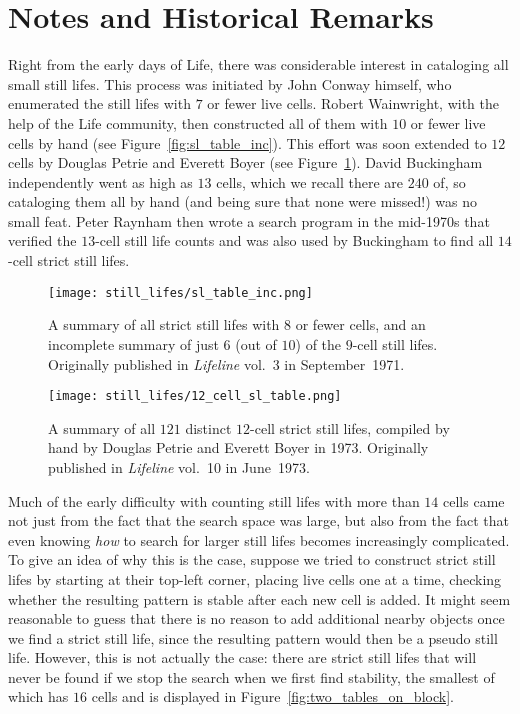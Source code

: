 \section{Notes and Historical Remarks}\label{sec:still_lifes_notes}

Right from the early days of Life, there was considerable interest in cataloging all small still lifes. This process was initiated by John Conway himself, who enumerated the still lifes with $7$ or fewer live cells. Robert Wainwright, with the help of the Life community, then constructed all of them with $10$ or fewer live cells by hand (see Figure~\ref{fig:sl_table_inc}). This effort was soon extended to $12$ cells by Douglas Petrie and Everett Boyer (see Figure~\ref{fig:12_cell_sl_table}). David Buckingham independently went as high as $13$ cells, which we recall there are $240$ of, so cataloging them all by hand (and being sure that none were missed!) was no small feat. Peter Raynham then wrote a search program in the mid-1970s that verified the $13$-cell still life counts and was also used by Buckingham to find all $14$-cell strict still lifes.

\begin{figure}[!htb]
	\centering
	\begin{minipage}[b]{0.48\textwidth}
		\centering\texttt{[image: still\_lifes/sl\_table\_inc.png]}
		\caption{A summary of all strict still lifes with $8$ or fewer cells, and an incomplete summary of just $6$ (out of $10$) of the $9$-cell still lifes. Originally published in \emph{Lifeline} vol.~3 in September~1971.}\label{fig:sl_table_inc}
	\end{minipage}\hfill
	\begin{minipage}[b]{0.48\textwidth}
		\centering\texttt{[image: still\_lifes/12\_cell\_sl\_table.png]}
		\caption{A summary of all $121$ distinct $12$-cell strict still lifes, compiled by hand by Douglas Petrie and Everett Boyer in 1973. Originally published in \emph{Lifeline} vol.~10 in June~1973.}\label{fig:12_cell_sl_table}
	\end{minipage}
\end{figure}

Much of the early difficulty with counting still lifes with more than $14$ cells came not just from the fact that the search space was large, but also from the fact that even knowing \emph{how} to search for larger still lifes becomes increasingly complicated. To give an idea of why this is the case, suppose we tried to construct strict still lifes by starting at their top-left corner, placing live cells one at a time, checking whether the resulting pattern is stable after each new cell is added. It might seem reasonable to guess that there is no reason to add additional nearby objects once we find a strict still life, since the resulting pattern would then be a pseudo still life. However, this is not actually the case: there are strict still lifes that will never be found if we stop the search when we first find stability, the smallest of which has $16$ cells and is displayed in Figure~\ref{fig:two_tables_on_block}.

